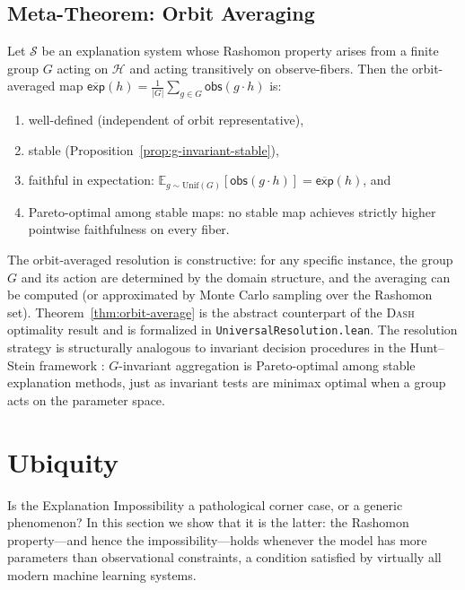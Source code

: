 \documentclass[twoside]{jmlr}
\newcommand{\E}{\mathbb{E}}
\newcommand{\DASH}{\textsc{Dash}}
\newcommand{\sH}{\mathcal{H}}
\begin{document}
\subsection{Meta-Theorem: Orbit Averaging}
\label{sec:meta-theorem}

\begin{theorem}
\label{thm:orbit-average}
Let $\mathcal{S}$ be an explanation system whose Rashomon property arises
from a finite group $G$ acting on $\sH$ and acting transitively on
observe-fibers.  Then the orbit-averaged map
$\overline{\mathsf{exp}}(h) = \frac{1}{|G|}\sum_{g \in G}\mathsf{obs}(g \cdot h)$
is:
\begin{enumerate}
  \item well-defined (independent of orbit representative),
  \item stable (Proposition~\ref{prop:g-invariant-stable}),
  \item faithful in expectation: $\E_{g \sim \mathrm{Unif}(G)}[\mathsf{obs}(g \cdot h)] = \overline{\mathsf{exp}}(h)$, and
  \item Pareto-optimal among stable maps: no stable map achieves strictly
    higher pointwise faithfulness on every fiber.
\end{enumerate}
\end{theorem}

\noindent
The orbit-averaged resolution is constructive: for any specific instance, the
group $G$ and its action are determined by the domain structure, and the
averaging can be computed (or approximated by Monte Carlo sampling over the
Rashomon set).  Theorem~\ref{thm:orbit-average} is the abstract counterpart
of the \DASH{} optimality result and is formalized in
\texttt{UniversalResolution.lean}.
The resolution strategy is structurally analogous to invariant decision
procedures in the Hunt--Stein framework \citep{lehmann2005testing}:
$G$-invariant aggregation is Pareto-optimal among stable explanation methods,
just as invariant tests are minimax optimal when a group acts on the parameter space.

\section{Ubiquity}
\label{sec:ubiquity}

Is the Explanation Impossibility a pathological corner case, or a
generic phenomenon?  In this section we show that it is the latter: the
Rashomon property---and hence the impossibility---holds whenever the model
has more parameters than observational constraints, a condition satisfied by
virtually all modern machine learning systems.
\end{document}
